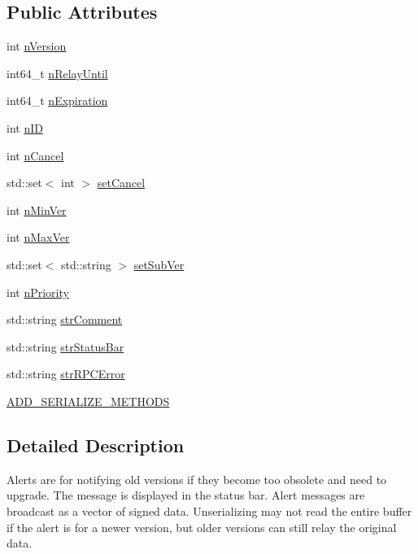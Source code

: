 \subsection*{Public Attributes}
\begin{DoxyCompactItemize}
\item 
int \mbox{\hyperlink{class_c_unsigned_alert_ad8fad8e8f62caaf8162fad19170de2cf}{n\+Version}}
\item 
int64\+\_\+t \mbox{\hyperlink{class_c_unsigned_alert_a13bb82aef8b496584f6b3ae6424f8e58}{n\+Relay\+Until}}
\item 
int64\+\_\+t \mbox{\hyperlink{class_c_unsigned_alert_af77a9d4d3abc0a0b376a7689059620e8}{n\+Expiration}}
\item 
int \mbox{\hyperlink{class_c_unsigned_alert_a4e11dc713526f6597a20762e707518a0}{n\+ID}}
\item 
int \mbox{\hyperlink{class_c_unsigned_alert_a28de8ffcdfea75db2061b2cdc1add04a}{n\+Cancel}}
\item 
std\+::set$<$ int $>$ \mbox{\hyperlink{class_c_unsigned_alert_ab1978ea23d02720d515bcdcf9d0dbdb0}{set\+Cancel}}
\item 
int \mbox{\hyperlink{class_c_unsigned_alert_af7ab540ea7df8e97fbfba7551ec31b1a}{n\+Min\+Ver}}
\item 
int \mbox{\hyperlink{class_c_unsigned_alert_a041bff847e178c132cb4d5234c1f41c8}{n\+Max\+Ver}}
\item 
std\+::set$<$ std\+::string $>$ \mbox{\hyperlink{class_c_unsigned_alert_a1b7148c413e1781222c5748935cad200}{set\+Sub\+Ver}}
\item 
int \mbox{\hyperlink{class_c_unsigned_alert_acf7253ae21d58a8633faab0635f5f5f5}{n\+Priority}}
\item 
std\+::string \mbox{\hyperlink{class_c_unsigned_alert_a8c9cd8c9706c14df3c5d6b9b1ed3b130}{str\+Comment}}
\item 
std\+::string \mbox{\hyperlink{class_c_unsigned_alert_a97cfbf9a49b770bb84e49389ac1489c2}{str\+Status\+Bar}}
\item 
std\+::string \mbox{\hyperlink{class_c_unsigned_alert_afc53ee9fa8b93b30f4a130806c547cea}{str\+R\+P\+C\+Error}}
\item 
\mbox{\hyperlink{class_c_unsigned_alert_a24489988876bbf2c38a5f379e4057a53}{A\+D\+D\+\_\+\+S\+E\+R\+I\+A\+L\+I\+Z\+E\+\_\+\+M\+E\+T\+H\+O\+DS}}
\end{DoxyCompactItemize}


\subsection{Detailed Description}
Alerts are for notifying old versions if they become too obsolete and need to upgrade. The message is displayed in the status bar. Alert messages are broadcast as a vector of signed data. Unserializing may not read the entire buffer if the alert is for a newer version, but older versions can still relay the original data. 

